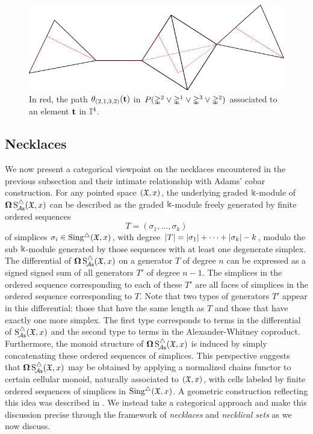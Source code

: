 \begin{figure}
	\centering
	\includegraphics[scale=1]{aux/theta2.pdf}
	\caption{In red, the path $\theta_{(2,1,3,2)}(\mathbf{t})$ in $P(\mathbb{\Delta}^2 \vee \mathbb{\Delta}^1 \vee \mathbb{\Delta}^3 \vee \mathbb{\Delta}^2)$ associated to an element $\mathbf{t}$ in $\mathbb{I}^{4}$.}
	\label{f:theta2}
\end{figure}

\subsection{Necklaces}

We now present a categorical viewpoint on the necklaces encountered in the previous subsection and their intimate relationship with Adams' cobar construction.
For any pointed space $(\mathfrak{X},x)$, the underlying graded $\Bbbk$-module of $\operatorname{\mathbf{\Omega}} \operatorname{S^{\triangle}_{\!{\mathcal{A}\mathsf{s}}}}(\mathfrak{X},x)$ can be described as the graded $\Bbbk$-module freely generated by finite ordered sequences
\[
T = (\sigma_1, \dots, \sigma_k)
\]
of simplices $\sigma_i \in \operatorname{Sing^{\triangle}}(\mathfrak{X},x)$, with degree $\lvert T\rvert = \lvert\sigma_1\rvert+\dots+\lvert\sigma_k\rvert - k$, modulo the sub $\Bbbk$-module generated by those sequences with at least one degenerate simplex.
The differential of $\operatorname{\mathbf{\Omega}} \operatorname{S^{\triangle}_{\!{\mathcal{A}\mathsf{s}}}}(\mathfrak{X},x)$ on a generator $T$ of degree $n$ can be expressed as a signed signed sum of all generators $T'$ of degree $n-1$. The simplices in the ordered sequence corresponding to each of these $T'$ are all faces of simplices in the ordered sequence corresponding to $T$. Note that two types of generators $T'$ appear in this differential: those that have the same length as $T$ and those that have exactly one more simplex. The first type corresponds to terms in the differential of $\operatorname{S^{\triangle}_{\!{\mathcal{A}\mathsf{s}}}}(\mathfrak{X},x)$ and the second type to terms in the Alexander-Whitney coproduct. 
Furthermore, the monoid structure of $\operatorname{\mathbf{\Omega}} \operatorname{S^{\triangle}_{\!{\mathcal{A}\mathsf{s}}}}(\mathfrak{X},x)$ is induced by simply concatenating these ordered sequences of simplices.
This perspective suggests that $\operatorname{\mathbf{\Omega}} \operatorname{S^{\triangle}_{\!{\mathcal{A}\mathsf{s}}}}(\mathfrak{X},x)$ may be obtained by applying a normalized chains functor to certain cellular monoid, naturally associated to $(\mathfrak{X},x)$, with cells labeled by finite ordered sequences of simplices in $\operatorname{Sing^{\triangle}}(\mathfrak{X},x)$.
A geometric construction reflecting this idea was described in \cite{baues1980geometry}.
We instead take a categorical approach and make this discussion precise through the framework of \textit{necklaces} and \textit{necklical sets} as we now discuss.

